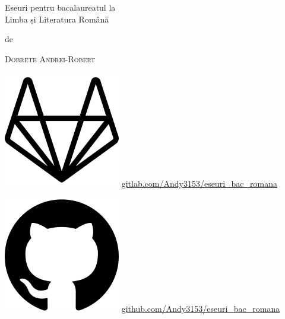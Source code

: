 \documentclass[
 12pt,                       %
 a4paper                     %
]{book}
\renewcommand{\headrulewidth}{0pt}
\renewcommand{\footrulewidth}{1pt}
\renewcommand{\headrulewidth}{2pt}
\renewcommand{\footrulewidth}{1pt}
\begin{document}
\begin{titlepage}
 \centering
 \vspace*{1cm}
 \vspace{4\baselineskip}
 {\Huge
 Eseuri pentru bacalaureatul la \\ Limba și Literatura Română\par}
 \vspace{4\baselineskip}
 de\par
 {\Large\textsc{Dobrete Andrei-Robert}\par}
 \vfill
 \includegraphics[height=\fontcharht\font`\B]{gitlab}
 \url{gitlab.com/Andy3153/eseuri_bac_romana}\par
 \includegraphics[height=\fontcharht\font`\B]{github}
 \url{github.com/Andy3153/eseuri_bac_romana}\par
 \vspace{1.5\baselineskip}
 {\large\LaTeXe}
\end{titlepage}


\clearpage
{
  \pagestyle{empty}
  {
    \fancyhf{}
    \renewcommand{\headrulewidth}{0pt}
    \renewcommand{\footrulewidth}{0pt}
  }
  \tableofcontents       %
  \thispagestyle{empty}
}
\pagestyle{plain}        %
\end{document}

